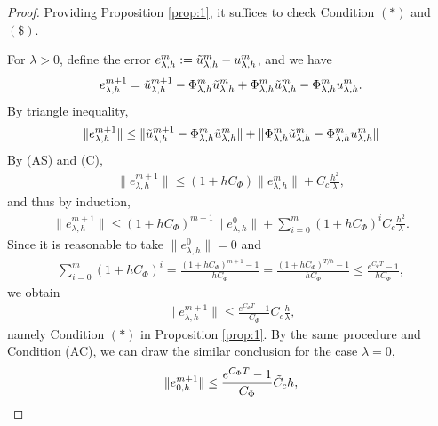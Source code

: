 \documentclass{report}
\begin{document}
\begin{proof}[Proof]
Providing Proposition \ref{prop:1}, it suffices to check Condition $(*)$ and $(\$)$.

For $\lambda > 0$, define the error $e^{m}_{\lambda,h} := \Tilde{u}_{\lambda,h}^{m} - u_{\lambda,h}^{m}$, and we have 
\begin{align*}
    e^{m+1}_{\lambda,h} = \Tilde{u}_{\lambda,h}^{m+1} - \Phi^m_{\lambda,h} \Tilde{u}_{\lambda,h}^{m} + \Phi^m_{\lambda,h} \Tilde{u}_{\lambda,h}^{m} - \Phi^m_{\lambda,h}u_{\lambda,h}^{m}.
\end{align*}
By triangle inequality,
\begin{align*}
    \|e^{m+1}_{\lambda,h}\| \leq \|\Tilde{u}_{\lambda,h}^{m+1} - \Phi^m_{\lambda,h} \Tilde{u}_{\lambda,h}^{m}\| + \|\Phi^m_{\lambda,h} \Tilde{u}_{\lambda,h}^{m} - \Phi^m_{\lambda,h}u_{\lambda,h}^{m}\|
\end{align*}
By (AS) and (C), 
\begin{align*}
    \|e^{m+1}_{\lambda,h}\| \leq (1+hC_\Phi)\|e^m_{\lambda,h}\|+ C_c\frac{h^2}{\lambda},
\end{align*}
and thus by induction,
\begin{align*}
    \|e^{m+1}_{\lambda,h}\| \leq (1+hC_\Phi)^{m+1}\|e^0_{\lambda,h}\| + \sum_{i=0}^{m}(1+hC_\Phi)^iC_c\frac{h^2}{\lambda}.
\end{align*}
Since it is reasonable to take $\|e^0_{\lambda,h}\|=0$ and
\begin{align*}
    \sum_{i=0}^{m}(1+hC_\Phi)^i = \frac{(1+hC_\Phi)^{m+1} - 1}{hC_\Phi} = \frac{(1+hC_\Phi)^{T/h} - 1}{hC_\Phi} \leq \frac{e^{C_\Phi T}-1}{hC_\Phi}, 
\end{align*}
we obtain
\begin{align*}
    \|e^{m+1}_{\lambda,h}\| \leq \frac{e^{C_\Phi T}-1}{C_\Phi}C_c\frac{h}{\lambda}, 
\end{align*}
namely Condition $(*)$ in Proposition \ref{prop:1}.
By the same procedure and Condition (AC), we can draw the similar conclusion for the case $\lambda = 0$,
\begin{align}\label{equ:prop2-arg1}
    \|e^{m+1}_{0,h}\| \leq \frac{e^{C_\Phi T}-1}{C_\Phi}\Tilde{C}_ch, 
\end{align}


\end{proof}
\end{document}
